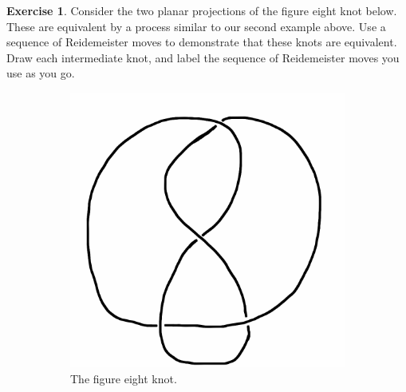 \documentclass[12pt,letterpaper]{article}
\theoremstyle{definition}
\newtheorem{exercise}[question]{Exercise}
\begin{document}
\clearpage


\begin{exercise} Consider the two planar projections of the figure eight knot below.
These are equivalent by a process similar to our second example above.
Use a sequence of Reidemeister moves to demonstrate that these knots are equivalent.
Draw each intermediate knot, and label the sequence of Reidemeister moves you use as you go.
\end{exercise}

\begin{figure}[h]
    \centering
    \begin{subfigure}{.3\textwidth}
        \centering
        \includegraphics[width=\textwidth]{knotpics/9SeptQ3a.png}
        \caption{The figure eight knot.}
    \end{subfigure}
    \hspace{2cm}
    \begin{subfigure}{.3\textwidth}
        \centering

\end{subfigure}
\end{figure}
\end{document}
